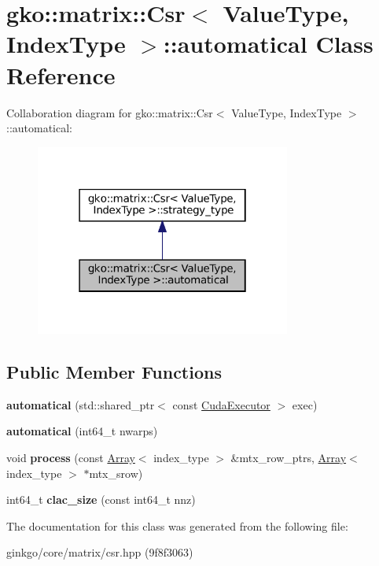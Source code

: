 \hypertarget{classgko_1_1matrix_1_1Csr_1_1automatical}{}\section{gko\+:\+:matrix\+:\+:Csr$<$ Value\+Type, Index\+Type $>$\+:\+:automatical Class Reference}
\label{classgko_1_1matrix_1_1Csr_1_1automatical}


Collaboration diagram for gko\+:\+:matrix\+:\+:Csr$<$ Value\+Type, Index\+Type $>$\+:\+:automatical\+:
\nopagebreak
\begin{figure}[H]
\begin{center}
\leavevmode
\includegraphics[width=238pt]{classgko_1_1matrix_1_1Csr_1_1automatical__coll__graph}
\end{center}
\end{figure}
\subsection*{Public Member Functions}
\begin{DoxyCompactItemize}
\item 
\mbox{\label{classgko_1_1matrix_1_1Csr_1_1automatical_a5e3cff9dc55b22b01ddf3db31731b267}} 
{\bfseries automatical} (std\+::shared\+\_\+ptr$<$ const \hyperlink{classgko_1_1CudaExecutor}{Cuda\+Executor} $>$ exec)
\item 
\mbox{\label{classgko_1_1matrix_1_1Csr_1_1automatical_af69e7b41ae7edd4d89c9a41763eb8ed9}} 
{\bfseries automatical} (int64\+\_\+t nwarps)
\item 
\mbox{\label{classgko_1_1matrix_1_1Csr_1_1automatical_adfc6b9f6bc311a1dedb758009a541741}} 
void {\bfseries process} (const \hyperlink{classgko_1_1Array}{Array}$<$ index\+\_\+type $>$ \&mtx\+\_\+row\+\_\+ptrs, \hyperlink{classgko_1_1Array}{Array}$<$ index\+\_\+type $>$ $\ast$mtx\+\_\+srow)
\item 
\mbox{\label{classgko_1_1matrix_1_1Csr_1_1automatical_af4ea78545a4fbdacfb75951fe3d0a701}} 
int64\+\_\+t {\bfseries clac\+\_\+size} (const int64\+\_\+t nnz)
\end{DoxyCompactItemize}


The documentation for this class was generated from the following file\+:\begin{DoxyCompactItemize}
\item 
ginkgo/core/matrix/csr.\+hpp (9f8f3063)\end{DoxyCompactItemize}
